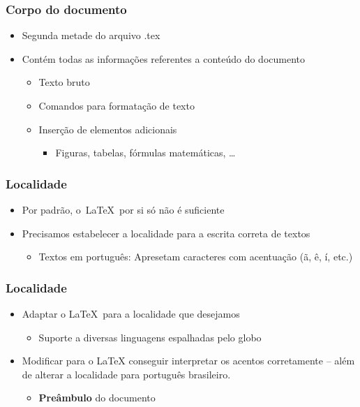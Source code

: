 \begin{frame} \frametitle{Corpo do documento}
\begin{itemize}
	\item Segunda metade do arquivo .tex
	\item Contém todas as informações referentes a conteúdo do documento
	\begin{itemize}
		\item Texto bruto
		\item Comandos para formatação de texto
		\item Inserção de elementos adicionais
		\begin{itemize}
			\item Figuras, tabelas, fórmulas matemáticas, \ldots
		\end{itemize}
	\end{itemize}
\end{itemize}
\end{frame}

\begin{frame} \frametitle{Localidade}
\begin{itemize}
	\item Por padrão, o~LaTeX~por si só não é suficiente
	\item Precisamos estabelecer a localidade para a escrita correta de textos
	\begin{itemize}
		\item Textos em português: Apresetam caracteres com acentuação (ã, ê, í, etc.)
	\end{itemize}
\end{itemize}
\end{frame}

\begin{frame} \frametitle{Localidade}
\begin{itemize}
	\item Adaptar o LaTeX~para a localidade que desejamos
	\begin{itemize}
		\item Suporte a diversas linguagens espalhadas pelo globo
	\end{itemize}
	\item Modificar para o LaTeX conseguir interpretar os acentos corretamente -- além de alterar a localidade para português brasileiro.
	\begin{itemize}
		\item \textbf{Preâmbulo} do documento
	\end{itemize}
\end{itemize}
\end{frame}

